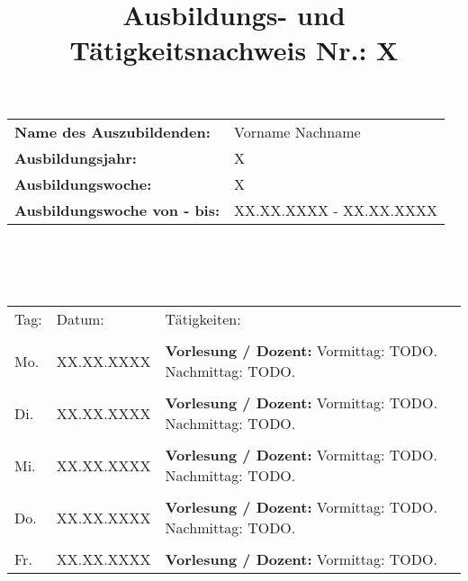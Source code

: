 \documentclass[10pt,a4paper]{article}
\author{}
\date{}
\title{Ausbildungs- und Tätigkeitsnachweis Nr.: X}
\begin{document}
\maketitle
%
%
\begin{tabular}{l|l}
  \textbf{Name des Auszubildenden:} & Vorname Nachname\\
  \textbf{Ausbildungsjahr:} & X\\
  \textbf{Ausbildungswoche:} & X\\
  \textbf{Ausbildungswoche von - bis:} & XX.XX.XXXX - XX.XX.XXXX\\
\end{tabular}
\\
\\\\
%
%
\begin{tabular}{l l p{9cm} l}
  Tag: &  Datum: &  Tätigkeiten:\\
  \firsthline\\
  Mo. & XX.XX.XXXX & \textbf{Vorlesung / Dozent:}\newline
    Vormittag: TODO.\newline
    Nachmittag: TODO.\\\\
  Di. & XX.XX.XXXX & \textbf{Vorlesung / Dozent:}\newline
    Vormittag: TODO.\newline
    Nachmittag: TODO.\\\\
  Mi. & XX.XX.XXXX & \textbf{Vorlesung / Dozent:}\newline
    Vormittag: TODO.\newline
    Nachmittag: TODO.\\\\
  Do. & XX.XX.XXXX & \textbf{Vorlesung / Dozent:}\newline
    Vormittag: TODO.\newline
    Nachmittag: TODO.\\\\
  Fr. & XX.XX.XXXX & \textbf{Vorlesung / Dozent:}\newline
    Vormittag: TODO.\\
\end{tabular}
\end{document}
